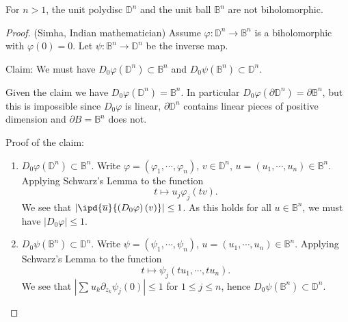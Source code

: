 \begin{theorem}[Poincar\'{e}]
 For $n>1$, the unit polydisc $\mathbb{D}^{n}$ and the unit ball $\mathbb{B}^{n}$ are not biholomorphic. 
\end{theorem}
\begin{proof}
  (Simha, Indian mathematician) Assume $\varphi:\mathbb{D}^{n}\to \mathbb{B}^{n}$ is a biholomorphic with $\varphi(0)=0$. Let $\psi:\mathbb{B}^{n}\to \mathbb{D}^{n}$ be the inverse map. 

  Claim: We must have $D_0\varphi(\mathbb{D}^{n})\subset \mathbb{B}^{n}$ and $D_0 \psi(\mathbb{B}^{n})\subset \mathbb{D}^{n}$. 
  
  Given the claim we have $D_0\varphi(\mathbb{D}^{n})=\mathbb{B}^{n}$. In particular $D_0\varphi(\partial \mathbb{D}^{n})=\partial \mathbb{B}^{n}$, but this is impossible since $D_0\varphi$ is linear, $\partial \mathbb{D}^{n}$ contains linear pieces of positive dimension and $\partial B=\mathbb{B}^{n}$ does not.

  Proof of the claim: 
  \begin{enumerate}
    \item $D_0\varphi(\mathbb{D}^{n})\subset  \mathbb{B}^{n}$. Write $\varphi=\left( \varphi_1,\cdots ,\varphi_n \right) $, $v\in \mathbb{D}^{n}$, $u=(u_1,\cdots ,u_n)\in  \mathbb{B}^{n}$. Applying Schwarz's Lemma to the function
      \[
	t\mapsto u_j\varphi_{j}(tv).
      \] 
      We see that $|\ipd{\overline{u}}{\left( D_0\varphi \right)(v) }|\le 1$. As this holds for all $u \in \mathbb{B}^{n}$, we must have $|D_0 \varphi|\le 1$.
    \item $D_0 \psi(\mathbb{B}^{n})\subset \mathbb{D}^{n}$. Write $\psi=\left( \psi_1,\cdots ,\psi_n \right) $, $u=\left( u_1,\cdots ,u_n \right) \in \mathbb{B}^{n}$. Applying Schwarz's Lemma to the function 
      \[
	t\mapsto \psi_j\left( tu_1,\cdots ,tu_n \right) .
      \] 
      We see that $|\sum_{}^{} u_k \partial_{z_k}\psi_j(0)|\le 1$ for $1\le j\le n$, hence $D_0\psi(\mathbb{B}^{n})\subset \mathbb{D}^{n}$.
  \end{enumerate}
\end{proof}

